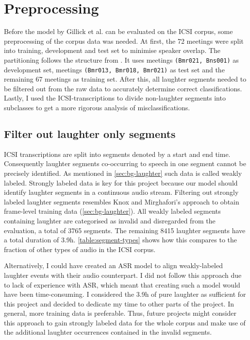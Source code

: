 \documentclass[bsc,frontabs,parskip,deptreport]{infthesis}
\begin{document}
\section{Preprocessing} \label{sec:preprocessing}
Before the model by Gillick et al. can be evaluated on the ICSI corpus, some preprocessing of the corpus data was needed.
At first, the 72 meetings were split into training, development and test set to minimise speaker overlap. The partitioning follows the structure from \citet{renals2014neural}. It uses meetings \texttt{(Bmr021, Bns001)} as development set, meetings \texttt{(Bmr013, Bmr018, Bmr021)} as test set and the remaining 67 meetings as training set.
After this, all laughter segments needed to be filtered out from the raw data to accurately determine correct classifications. 
Lastly, I used the ICSI-transcriptions to divide non-laughter segments into subclasses to get a more rigorous analysis of misclassifications.

\subsection{Filter out laughter only segments} \label{subsec:filter-laughter}
ICSI transcriptions are split into segments denoted by a start and end time.
Consequently laughter segments co-occurring to speech in one segment cannot be precisely identified.
As mentioned in \autoref{sec:bg-laughter} such data is called weakly labeled.
Strongly labeled data is key for this project because our model should identify laughter segments in a continuous audio stream.
Filtering out strongly labeled laughter segments resembles Knox and Mirghafori's approach to obtain frame-level training data \citep{knox2006automatic} (\autoref{sec:bg-laughter}). 
All weakly labeled segments containing laughter are categorised as invalid and disregarded from the evaluation, a total of 3765 segments.
The remaining 8415 laughter segments have a total duration of 3.9h. \autoref{table:segment-types} shows how this compares to the fraction of other types of audio in the ICSI corpus.

Alternatively, I could have created an ASR model to align weakly-labeled laughter events with their audio counterpart. 
I did not follow this approach due to lack of experience with ASR, which meant that creating such a model would have been time-consuming. I considered the 3.9h of pure laughter as sufficient for this project and decided to dedicate my time to other parts of the project.
In general, more training data is preferable. Thus, future projects might consider this approach to gain strongly labeled data for the whole corpus and make use of the additional laughter occurrences contained in the invalid segments. 
\end{document}

